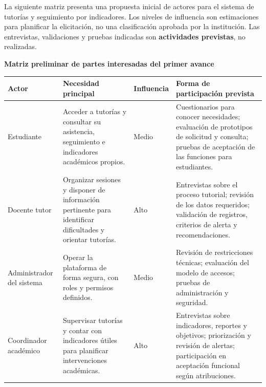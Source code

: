 
La siguiente matriz presenta una propuesta inicial de actores para el sistema de tutorías y seguimiento por indicadores. Los niveles de influencia son estimaciones para planificar la elicitación, no una clasificación aprobada por la institución. Las entrevistas, validaciones y pruebas indicadas son \textbf{actividades previstas}, no realizadas.

\par\medskip
\noindent\begin{minipage}{\textwidth}
\centering
\small
\textbf{Matriz preliminar de partes interesadas del primer avance}\par\smallskip
\begin{tabular}{@{}p{2.5cm}p{3.65cm}p{1.7cm}p{5.3cm}@{}}
\toprule
\textbf{Actor} & \textbf{Necesidad principal} & \textbf{Influencia} & \textbf{Forma de participación prevista} \\
\midrule
Estudiante & Acceder a tutorías y consultar su asistencia, seguimiento e indicadores académicos propios. & Medio & Cuestionarios para conocer necesidades; evaluación de prototipos de solicitud y consulta; pruebas de aceptación de las funciones para estudiantes. \\
\addlinespace
Docente tutor & Organizar sesiones y disponer de información pertinente para identificar dificultades y orientar tutorías. & Alto & Entrevistas sobre el proceso tutorial; revisión de los datos requeridos; validación de registros, criterios de alerta y recomendaciones. \\
\addlinespace
Administrador del sistema & Operar la plataforma de forma segura, con roles y permisos definidos. & Medio & Revisión de restricciones técnicas; evaluación del modelo de accesos; pruebas de administración y seguridad. \\
\addlinespace
Coordinador académico & Supervisar tutorías y contar con indicadores útiles para planificar intervenciones académicas. & Alto & Entrevistas sobre indicadores, reportes y objetivos; priorización y revisión de alertas; participación en aceptación funcional según atribuciones. \\
\bottomrule
\end{tabular}
\end{minipage}
\par\medskip

